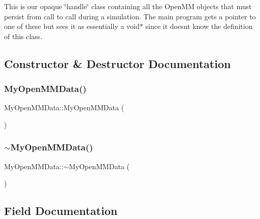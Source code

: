 This is our opaque \char`\"{}handle\char`\"{} class containing all the Open\+MM objects that must persist from call to call during a simulation. The main program gets a pointer to one of these but sees it as essentially a void$\ast$ since it doesn\textquotesingle{}t know the definition of this class. 

\subsection{Constructor \& Destructor Documentation}
\mbox{\label{structMyOpenMMData_ad91ea098216e5bbee8f0199d2a7e2c7d}} 
\subsubsection{\texorpdfstring{MyOpenMMData()}{MyOpenMMData()}}
{\footnotesize\ttfamily My\+Open\+M\+M\+Data\+::\+My\+Open\+M\+M\+Data (\begin{DoxyParamCaption}{ }\end{DoxyParamCaption})\hspace{0.3cm}{\ttfamily [inline]}}

\mbox{\label{structMyOpenMMData_a8b18e9a40611765e2c966495e2a339bb}} 
\subsubsection{\texorpdfstring{$\sim$MyOpenMMData()}{~MyOpenMMData()}}
{\footnotesize\ttfamily My\+Open\+M\+M\+Data\+::$\sim$\+My\+Open\+M\+M\+Data (\begin{DoxyParamCaption}{ }\end{DoxyParamCaption})\hspace{0.3cm}{\ttfamily [inline]}}



\subsection{Field Documentation}
\mbox{\label{structMyOpenMMData_a2d94acedaa245a3fb2faa48625fa7fc1}} 
